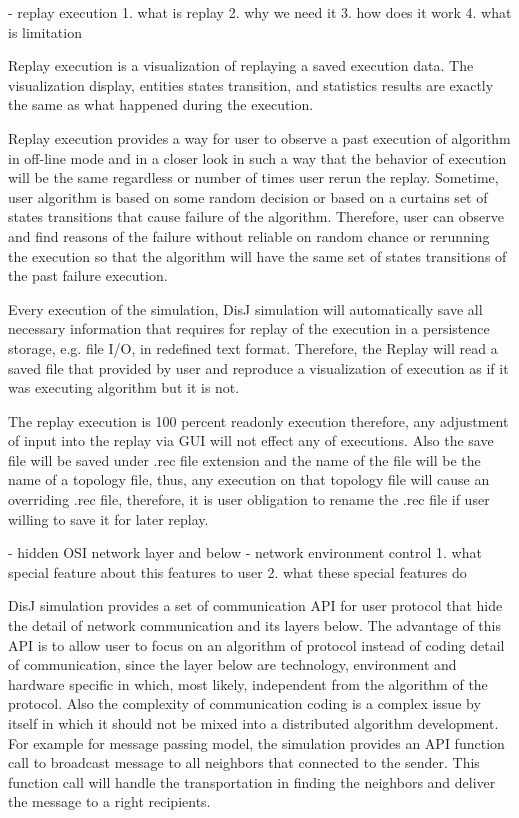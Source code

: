 - replay execution
1. what is replay
2. why we need it
3. how does it work
4. what is limitation

Replay execution is a visualization of replaying a saved execution data. The visualization display, entities states transition, and statistics results are exactly the same as what happened during the execution.

Replay execution provides a way for user to observe a past execution of algorithm in off-line mode and in a closer look in such a way that the behavior of execution will be the same regardless or number of times user rerun the replay. Sometime, user algorithm is based on some random decision or based on a curtains set of states transitions that cause failure of the algorithm. Therefore, user can observe and find reasons of the failure without reliable on random chance or rerunning the execution so that the algorithm will have the same set of states transitions of the past failure execution.

Every execution of the simulation, DisJ simulation will automatically save all necessary information that requires for replay of the execution in a persistence storage, e.g. file I/O, in redefined text format. Therefore, the Replay will read a saved file that provided by user and reproduce a visualization of execution as if it was executing algorithm but it is not.

The replay execution is 100 percent readonly execution therefore, any adjustment of input into the replay via GUI will not effect any of executions. Also the save file will be saved under .rec file extension and the name of the file will be the name of a topology file, thus, any execution on that topology file will cause an overriding .rec file, therefore, it is user obligation to rename the .rec file if user willing to save it for later replay.





- hidden OSI network layer and below
- network environment control
1. what special feature about this features to user
2. what these special features do

 DisJ simulation provides a set of communication API for user protocol that hide the detail of network communication and its layers below. The advantage of this API is to allow user to focus on an algorithm of protocol instead of coding detail of communication, since the layer below are technology, environment and hardware specific in which, most likely, independent from the algorithm of the protocol. Also the complexity of communication coding is a complex issue by itself in which it should not be mixed into a distributed algorithm development. For example for message passing model, the simulation provides an API function call to broadcast message to all neighbors that connected to the sender. This function call will handle the transportation in finding the neighbors and deliver the message to a right recipients.

